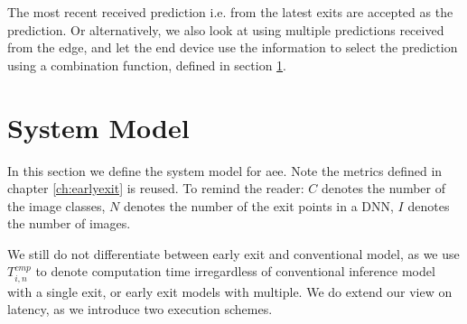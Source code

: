 The most recent received prediction i.e. from the latest exits are accepted as the prediction. Or alternatively, we also look at using multiple predictions received from the edge, and let the end device use the information to select the prediction using a combination function, defined in section \ref{sec:edge-system-model}.

\section{System Model} \label{sec:edge-system-model}

In this section we define the system model for \gls{aee}. Note the metrics defined in chapter \ref{ch:earlyexit} is reused. To remind the reader:  $ C $ denotes the number of the image classes, $ N $ denotes the number of the exit points in a DNN, $ I $ denotes the number of images. 

We still do not differentiate between early exit and conventional model,  as we use $ T_{i,n}^{cmp} $ to denote computation time irregardless of conventional inference model with a single exit, or early exit models with multiple. We do extend our view on latency, as we introduce two execution schemes.
	
